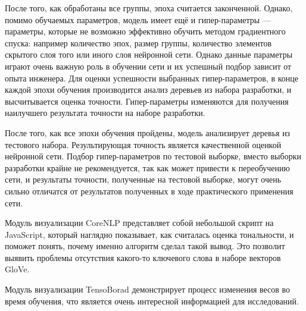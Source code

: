 После того, как обработаны все группы, эпоха считается законченной. Однако, помимо обучаемых параметров, модель имеет ещё и гипер-параметры --- параметры, которые не возможно эффективно обучить методом градиентного спуска: например количество эпох, размер группы, количество элементов скрытого слоя того или иного слоя нейронной сети. Однако данные параметры играют очень важную роль в обучении сети и их успешный подбор зависит от опыта инженера. Для оценки успешности выбранных гипер-параметров, в конце каждой эпохи обучения производится анализ деревьев из набора разработки, и высчитывается оценка точности. Гипер-параметры изменяются для получения наилучшего результата точности на наборе разработки.

После того, как все эпохи обучения пройдены, модель анализирует деревья из тестового набора. Результирующая точность является качественной оценкой нейронной сети. Подбор гипер-параметров по тестовой выборке, вместо выборки разработки крайне не рекомендуется, так как может привести к переобучению сети, и результаты точности, полученные на тестовой выборке, могут очень сильно отличатся от результатов полученных в ходе практического применения сети.

Модуль визуализации CoreNLP представляет собой небольшой скрипт на JavaScript, который наглядно показывает, как считалась оценка тональности, и поможет понять, почему именно алгоритм сделал такой вывод. Это позволит выявить проблемы отсутствия какого-то ключевого слова в наборе векторов GloVe.

Модуль визуализации TensoBorad демонстрирует процесс изменения весов во время обучения, что является очень интересной информацией для исследований.